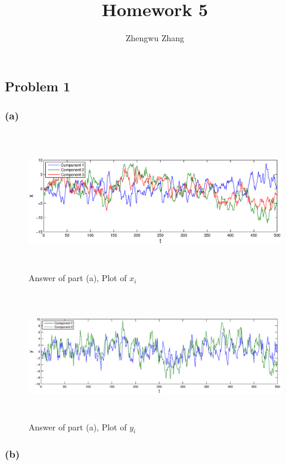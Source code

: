 \documentclass[14pt,letterpaper] {article}
\author{Zhengwu Zhang}
\title{Homework 5}
\begin{document}
 
\maketitle
\newpage

\subsection{Problem 1}
\subsubsection{(a)}
\begin{figure}
\begin{center}
\includegraphics[width=5.4in, height=2.4in]{plotx.eps}
\caption{Answer of part (a), Plot of {$x_i$}}
\end{center}
\end{figure}

\begin{figure}
\begin{center}
\includegraphics[width=5.4in, height=2.2in]{ploty.eps}
\caption{Answer of part (a), Plot of {$y_i$}}
\end{center}
\end{figure}

\subsubsection{(b)}
\end{document}
